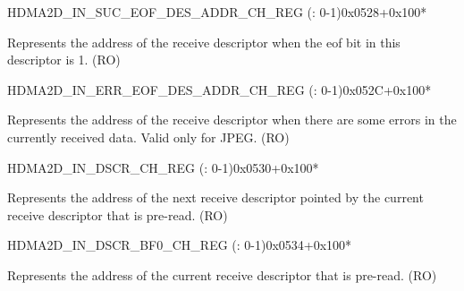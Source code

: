 \begin{register}{H}{DMA2D\_IN\_SUC\_EOF\_DES\_ADDR\_CH\_REG (: 0-1)}{0x0528+0x100*}\label{regdesc:DMA2DINSUCEOFDESADDRCHNREG}
%
\regnewline%
\begin{regdesc}\begin{reglist}
\label{fielddesc:DMA2DINSUCEOFDESADDRCHN}\item [DMA2D\_IN\_SUC\_EOF\_DES\_ADDR\_CH\regindex{n}] Represents the address of the receive descriptor when the eof bit in this descriptor is 1. (RO)
\end{reglist}\end{regdesc}
\end{register}


\begin{register}{H}{DMA2D\_IN\_ERR\_EOF\_DES\_ADDR\_CH\_REG (: 0-1)}{0x052C+0x100*}\label{regdesc:DMA2DINERREOFDESADDRCHNREG}
%
\regnewline%
\begin{regdesc}\begin{reglist}
\label{fielddesc:DMA2DINERREOFDESADDRCHN}\item [DMA2D\_IN\_ERR\_EOF\_DES\_ADDR\_CH\regindex{n}] Represents the address of the receive descriptor when there are some errors in the currently received data. Valid only for JPEG. (RO)
\end{reglist}\end{regdesc}
\end{register}


\begin{register}{H}{DMA2D\_IN\_DSCR\_CH\_REG (: 0-1)}{0x0530+0x100*}\label{regdesc:DMA2DINDSCRCHNREG}
%
\regnewline%
\begin{regdesc}\begin{reglist}
\label{fielddesc:DMA2DINLINKDSCRCHN}\item [DMA2D\_INLINK\_DSCR\_CH\regindex{n}] Represents the address of the next receive descriptor pointed by the current receive descriptor that is pre-read. (RO)
\end{reglist}\end{regdesc}
\end{register}


\begin{register}{H}{DMA2D\_IN\_DSCR\_BF0\_CH\_REG (: 0-1)}{0x0534+0x100*}\label{regdesc:DMA2DINDSCRBF0CHNREG}
%
\regnewline%
\begin{regdesc}\begin{reglist}
\label{fielddesc:DMA2DINLINKDSCRBF0CHN}\item [DMA2D\_INLINK\_DSCR\_BF0\_CH\regindex{n}] Represents the address of the current receive descriptor that is pre-read. (RO)
\end{reglist}\end{regdesc}
\end{register}


